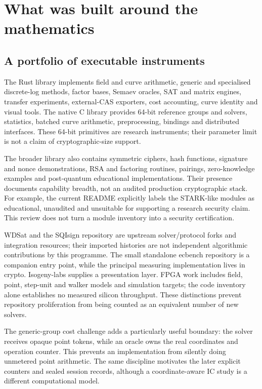 \section{What was built around the mathematics}\label{sec:systems}

\subsection{A portfolio of executable instruments}

The Rust library implements field and curve arithmetic, generic and
specialised discrete-log methods, factor bases, Semaev oracles, SAT and
matrix engines, transfer experiments, external-CAS exporters, cost
accounting, curve identity and visual tools. The native C library
provides 64-bit reference groups and solvers, statistics, batched curve
arithmetic, preprocessing, bindings and distributed interfaces. These
64-bit primitives are research instruments; their parameter limit is
not a claim of cryptographic-size support.

The broader library also contains symmetric ciphers, hash functions,
signature and nonce demonstrations, RSA and factoring routines,
pairings, zero-knowledge examples and post-quantum educational
implementations. Their presence documents capability breadth, not an
audited production cryptographic stack. For example, the current README
explicitly labels the STARK-like modules as educational, unaudited and
unsuitable for supporting a research security claim. This review does
not turn a module inventory into a security certification.

WDSat and the SQIsign repository are upstream solver/protocol forks and
integration resources; their imported histories are not independent
algorithmic contributions by this programme. The small standalone
ecbench repository is a companion entry point, while the principal
measuring implementation lives in crypto. Isogeny-labs supplies a
presentation layer. FPGA work includes field, point, step-unit and walker
models and simulation targets; the code inventory alone establishes no
measured silicon throughput. These distinctions prevent repository
proliferation from being counted as an equivalent number of new solvers.

The generic-group cost challenge adds a particularly useful boundary:
the solver receives opaque point tokens, while an oracle owns the real
coordinates and operation counter. This prevents an implementation from
silently doing unmetered point arithmetic. The same discipline motivates
the later explicit counters and sealed session records, although a
coordinate-aware IC study is a different computational model.

